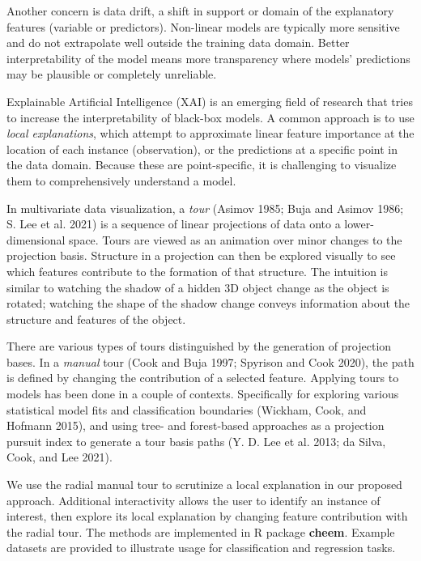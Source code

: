 \documentclass[
]{article}
\begin{document}
Another concern is data drift, a shift in support or domain of the explanatory features (variable or predictors). Non-linear models are typically more sensitive and do not extrapolate well outside the training data domain. Better interpretability of the model means more transparency where models' predictions may be plausible or completely unreliable.

Explainable Artificial Intelligence (XAI) is an emerging field of research that tries to increase the interpretability of black-box models. A common approach is to use \emph{local explanations}, which attempt to approximate linear feature importance at the location of each instance (observation), or the predictions at a specific point in the data domain. Because these are point-specific, it is challenging to visualize them to comprehensively understand a model.

In multivariate data visualization, a \emph{tour} (Asimov 1985; Buja and Asimov 1986; S. Lee et al. 2021) is a sequence of linear projections of data onto a lower-dimensional space. Tours are viewed as an animation over minor changes to the projection basis. Structure in a projection can then be explored visually to see which features contribute to the formation of that structure. The intuition is similar to watching the shadow of a hidden 3D object change as the object is rotated; watching the shape of the shadow change conveys information about the structure and features of the object.

There are various types of tours distinguished by the generation of projection bases. In a \emph{manual} tour (Cook and Buja 1997; Spyrison and Cook 2020), the path is defined by changing the contribution of a selected feature. Applying tours to models has been done in a couple of contexts. Specifically for exploring various statistical model fits and classification boundaries (Wickham, Cook, and Hofmann 2015), and using tree- and forest-based approaches as a projection pursuit index to generate a tour basis paths (Y. D. Lee et al. 2013; da Silva, Cook, and Lee 2021).

We use the radial manual tour to scrutinize a local explanation in our proposed approach. Additional interactivity allows the user to identify an instance of interest, then explore its local explanation by changing feature contribution with the radial tour. The methods are implemented in R package \textbf{cheem}. Example datasets are provided to illustrate usage for classification and regression tasks.
\end{document}
